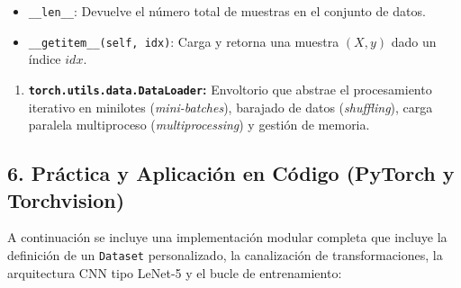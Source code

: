\documentclass[11pt,oneside]{article}
\begin{document}
\begin{itemize}

\item \texttt{\_\_len\_\_}: Devuelve el número total de muestras en el conjunto de datos.

\end{itemize}

\begin{itemize}

\item \texttt{\_\_getitem\_\_(self, idx)}: Carga y retorna una muestra \((X, y)\) dado un índice \(idx\).

\end{itemize}

\begin{enumerate}

\item \textbf{\texttt{torch.utils.data.DataLoader}:} Envoltorio que abstrae el procesamiento iterativo en minilotes (\emph{mini-batches}), barajado de datos (\emph{shuffling}), carga paralela multiproceso (\emph{multiprocessing}) y gestión de memoria.

\end{enumerate}

\subsection{6. Práctica y Aplicación en Código (PyTorch y Torchvision)}

A continuación se incluye una implementación modular completa que incluye la definición de un \texttt{Dataset} personalizado, la canalización de transformaciones, la arquitectura CNN tipo LeNet-5 y el bucle de entrenamiento:
\end{document}
